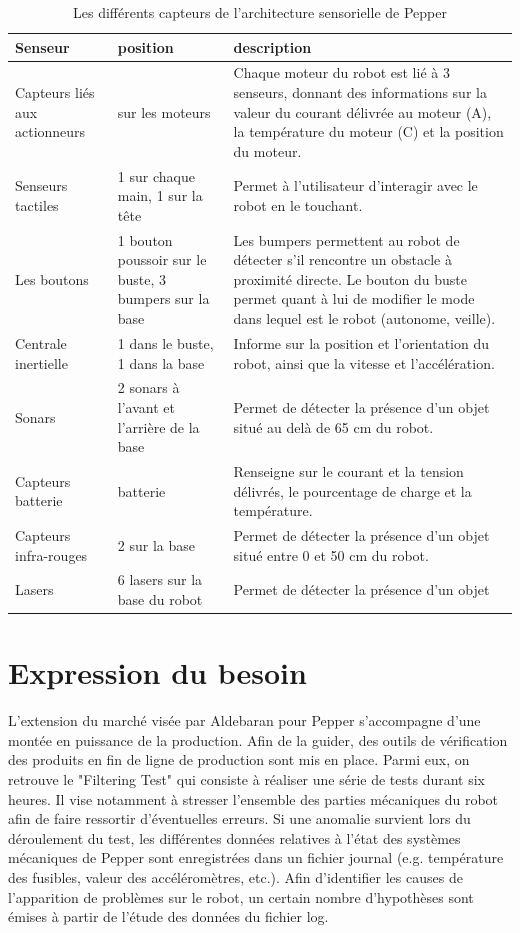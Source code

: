 \begin{table}[h]
	\begin{tabular}{ | p{3cm} | p{4cm} | p{7cm} | }
		\hline
		Senseur & position & description \\
		\hline
		Capteurs liés aux actionneurs & sur les moteurs & Chaque moteur du robot est lié à 3 senseurs, donnant des informations sur la valeur du courant délivrée au moteur (A), la température du moteur (C) et la position du moteur. \\
		\hline
		Senseurs tactiles & 1 sur chaque main, 1 sur la tête & Permet à l'utilisateur d'interagir avec le robot en le touchant.	\\	
		\hline 
		Les boutons & 1 bouton poussoir sur le buste, 3 bumpers sur la base & Les bumpers permettent au robot de détecter s'il rencontre un obstacle à proximité directe. Le bouton du buste permet quant à lui de modifier le mode dans lequel est le robot (autonome, veille). \\
		\hline 
		Centrale inertielle & 1 dans le buste, 1 dans la base & Informe sur la position et l'orientation du robot, ainsi que la vitesse et l'accélération. \\
		\hline
		Sonars & 2 sonars à l'avant et l'arrière de la base & Permet de détecter la présence d'un objet situé au delà de 65 cm du robot. \\
		\hline 
		Capteurs batterie & batterie & Renseigne sur le courant et la tension délivrés, le pourcentage de charge et la température. \\
		\hline
		Capteurs infra-rouges & 2 sur la base &  Permet de détecter la présence d'un objet situé entre 0 et 50 cm du robot. \\
		\hline
		Lasers & 6 lasers sur la base du robot & Permet de détecter la présence d'un objet \\
		\hline 
	\end{tabular}
	\caption[Les différents capteurs de Pepper]{Les différents capteurs de l'architecture sensorielle de Pepper}
	\label {tab: Les différents capteurs de Pepper}
\end{table}


\section{Expression du besoin}
\label{Introduction:Expression du besoin}
L'extension du marché visée par Aldebaran pour Pepper s'accompagne d'une montée en puissance de la production. Afin de la guider, des outils de vérification des produits en fin de ligne de production sont mis en place. Parmi eux, on retrouve le "Filtering Test" qui consiste à réaliser une série de tests durant six heures. Il vise notamment à stresser l'ensemble des parties mécaniques du robot afin de faire ressortir d'éventuelles erreurs. Si une anomalie survient lors du déroulement du test, les différentes données relatives à l'état des systèmes mécaniques de Pepper sont enregistrées dans un fichier journal (e.g. température des fusibles, valeur des accéléromètres, etc.). Afin d'identifier les causes de l'apparition de problèmes sur le robot, un certain nombre d'hypothèses sont émises à partir de l'étude des données du fichier log. 

